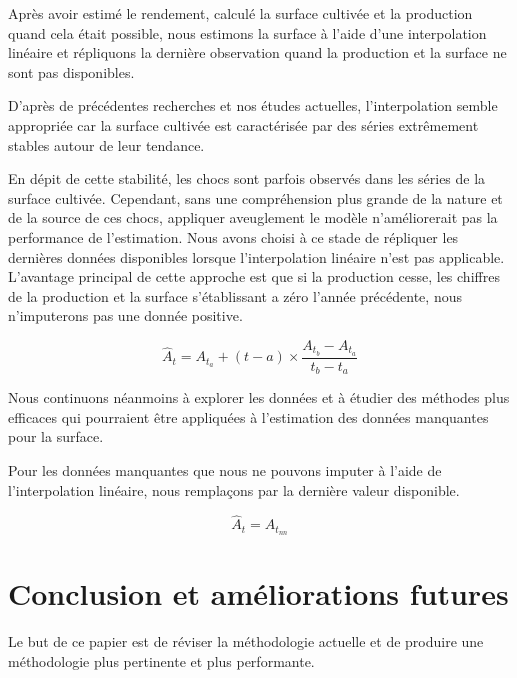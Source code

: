 \documentclass[nojss]{jss}\usepackage{graphicx, color}
\begin{document}
Apr\`{e}s avoir estim\'{e} le rendement, calcul\'{e} la surface
cultiv\'{e}e et la production quand cela \'{e}tait possible, nous
estimons la surface \`{a} l'aide d'une interpolation lin\'{e}aire et
r\'{e}pliquons la derni\`{e}re observation quand la production et la
surface ne sont pas disponibles.

D'apr\`{e}s de pr\'{e}c\'{e}dentes recherches et nos \'{e}tudes
actuelles, l'interpolation semble appropri\'{e}e car la surface
cultiv\'{e}e est caract\'{e}ris\'{e}e par des s\'{e}ries extr\^{e}mement
stables autour de leur tendance.


En d\'{e}pit de cette stabilit\'{e}, les chocs sont parfois
observ\'{e}s dans les s\'{e}ries de la surface cultiv\'{e}e.
Cependant, sans une compr\'{e}hension plus grande de la nature et de
la source de ces chocs, appliquer aveuglement le mod\`{e}le
n'am\'{e}liorerait pas la performance de l'estimation. Nous avons
choisi \`{a} ce stade de r\'{e}pliquer les derni\`{e}res donn\'{e}es
disponibles lorsque l'interpolation lin\'{e}aire n'est pas
applicable. L'avantage principal de cette approche est que si la
production cesse, les chiffres de la production et la surface
s'\'{e}tablissant a z\'{e}ro l'ann\'{e}e pr\'{e}c\'{e}dente, nous
n'imputerons pas une donn\'{e}e positive.


\begin{equation}
  \label{eq:linearInterpolation}
  \hat{A}_t = A_{t_a} + (t - a) \times \frac{A_{t_b} - A_{t_a}}{t_b - t_a}
\end{equation}

Nous continuons n\'{e}anmoins \`{a} explorer les donn\'{e}es et \`{a}
\'{e}tudier des m\'{e}thodes plus efficaces qui pourraient \^{e}tre
appliqu\'{e}es \`{a} l'estimation des donn\'{e}es manquantes pour la
surface.

Pour les donn\'{e}es manquantes que nous ne pouvons imputer \`{a}
l'aide de l'interpolation lin\'{e}aire, nous rempla\c{c}ons par la
derni\`{e}re valeur disponible.

\begin{equation}
  \label{eq:locf}
  \hat{A}_t = A_{t_{nn}}
\end{equation}


\section{Conclusion et am\'{e}liorations futures}

Le but de ce papier est de r\'{e}viser la m\'{e}thodologie actuelle et
de produire une m\'{e}thodologie plus pertinente et plus performante.
\end{document}
